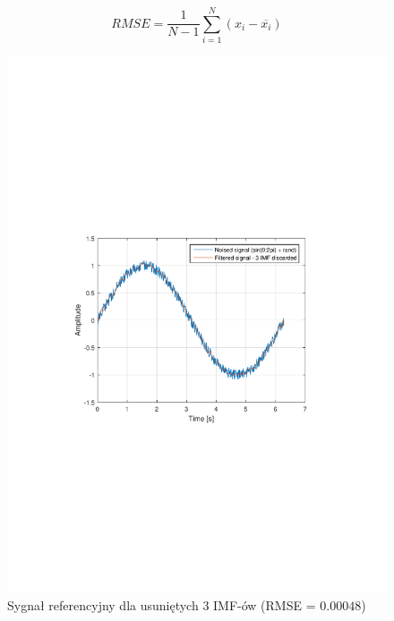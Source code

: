 \begin{equation}
    RMSE = \frac{1}{N-1}\sum_{i=1}^{N}(x_i-\overline{x_i})
    \label{equ:rmse}
\end{equation}

\begin{figure}[!htb]
    \begin{center}
        \includegraphics[width=13cm,trim=4cm 9cm 4cm 9cm,clip]
        {../img/sin_rmse3.pdf}
    \end{center}
    \caption{Sygnał referencyjny dla usuniętych 3 IMF-ów (RMSE = $0.00048$)}
    \label{rys:sin_rmse3}
\end{figure}

\newpage

